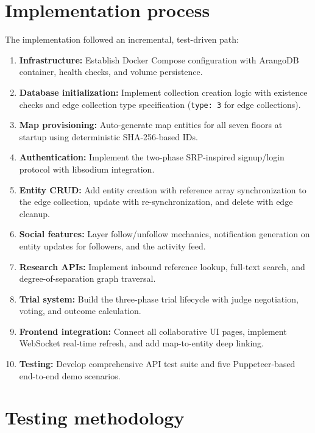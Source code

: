 \documentclass[13pt,a4paper]{report}
\begin{document}
\section{Implementation process}
The implementation followed an incremental, test-driven path:
\begin{enumerate}
    \item \textbf{Infrastructure:} Establish Docker Compose configuration with ArangoDB container, health checks, and volume persistence.
    \item \textbf{Database initialization:} Implement collection creation logic with existence checks and edge collection type specification (\texttt{type: 3} for edge collections).
    \item \textbf{Map provisioning:} Auto-generate map entities for all seven floors at startup using deterministic SHA-256-based IDs.
    \item \textbf{Authentication:} Implement the two-phase SRP-inspired signup/login protocol with libsodium integration.
    \item \textbf{Entity CRUD:} Add entity creation with reference array synchronization to the edge collection, update with re-synchronization, and delete with edge cleanup.
    \item \textbf{Social features:} Layer follow/unfollow mechanics, notification generation on entity updates for followers, and the activity feed.
    \item \textbf{Research APIs:} Implement inbound reference lookup, full-text search, and degree-of-separation graph traversal.
    \item \textbf{Trial system:} Build the three-phase trial lifecycle with judge negotiation, voting, and outcome calculation.
    \item \textbf{Frontend integration:} Connect all collaborative UI pages, implement WebSocket real-time refresh, and add map-to-entity deep linking.
    \item \textbf{Testing:} Develop comprehensive API test suite and five Puppeteer-based end-to-end demo scenarios.
\end{enumerate}

\section{Testing methodology}
\end{document}
